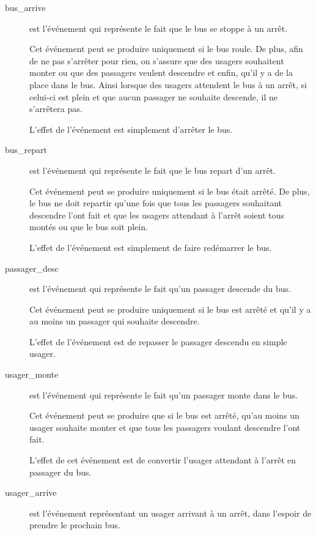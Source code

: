 \documentclass[a4paper,titlepage]{report}
\begin{document}
		\begin{description}
			\item[bus\_arrive] est l'événement qui représente le fait que le bus se stoppe à un arrêt.
			
			Cet événement peut se produire uniquement si le bus roule. De plus, afin de ne pas s'arrêter pour rien, on s'assure que des usagers souhaitent monter ou que des passagers veulent descendre et enfin, qu'il y a de la place dans le bus. Ainsi lorsque des usagers attendent le bus à un arrêt, si celui-ci est plein et que aucun passager ne souhaite descende, il ne s'arrêtera pas.
			
			L'effet de l'événement est simplement d'arrêter le bus.\\
		
			\item[bus\_repart] est l'événement qui représente le fait que le bus repart d'un arrêt.
			
			Cet événement peut se produire uniquement si le bus était arrêté. De plus, le bus ne doit repartir qu'une fois que tous les passagers souhaitant descendre l'ont fait et que les usagers attendant à l'arrêt soient tous montés ou que le bus soit plein.
			
			L'effet de l'événement est simplement de faire redémarrer le bus.\\
			
			\item[passager\_desc] est l'événement qui représente le fait qu'un passager descende du bus.
			
			Cet événement peut se produire uniquement si le bus est arrêté et qu'il y a au moins un passager qui souhaite descendre.
			
			L'effet de l'événement est de repasser le passager descendu en simple usager. \\
			
			\item[usager\_monte] est l'événement qui représente le fait qu'un passager monte dans le bus.
			
			Cet événement peut se produire que si le bus est arrêté, qu'au moins un usager souhaite monter et que tous les passagers voulant descendre l'ont fait.
			
			L'effet de cet événement est de convertir l'usager attendant à l'arrêt en passager du bus.\\
			
			\item[usager\_arrive] est l'événement représentant un usager arrivant à un arrêt, dans l'espoir de prendre le prochain bus.
			

\end{description}
\end{document}
